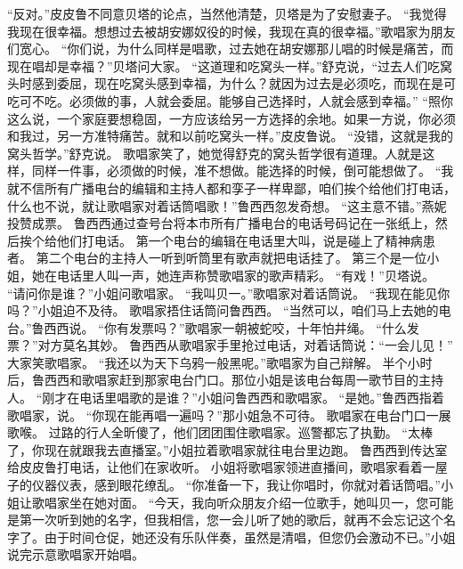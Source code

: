 \documentclass[a4paper,12pt,UTF8,twoside]{ctexbook}
\begin{document}
        “反对。”皮皮鲁不同意贝塔的论点，当然他清楚，贝塔是为了安慰妻子。  
        “我觉得我现在很幸福。想想过去被胡安娜奴役的时候，我现在真的很幸福。”歌唱家为朋友们宽心。  
        “你们说，为什么同样是唱歌，过去她在胡安娜那儿唱的时候是痛苦，而现在唱却是幸福？”贝塔问大家。  
        “这道理和吃窝头一样。”舒克说，“过去人们吃窝头时感到委屈，现在吃窝头感到幸福，为什么？就因为过去是必须吃，而现在是可吃可不吃。必须做的事，人就会委屈。能够自己选择时，人就会感到幸福。”  
        “照你这么说，一个家庭要想稳固，一方应该给另一方选择的余地。如果一方说，你必须和我过，另一方准特痛苦。就和以前吃窝头一样。”皮皮鲁说。        
        “没错，这就是我的窝头哲学。”舒克说。  
        歌唱家笑了，她觉得舒克的窝头哲学很有道理。人就是这样，同样一件事，必须做的时候，准不想做。能选择的时候，倒可能想做了。  
        “我就不信所有广播电台的编辑和主持人都和孪子一样卑鄙，咱们挨个给他们打电话，什么也不说，就让歌唱家对着话筒唱歌！”鲁西西忽发奇想。  
        “这主意不错。”燕妮投赞成票。  
        鲁西西通过查号台将本市所有广播电台的电话号码记在一张纸上，然后挨个给他们打电话。  
        第一个电台的编辑在电话里大叫，说是碰上了精神病患者。  
        第二个电台的主持人一听到听筒里有歌声就把电话挂了。  
        第三个是一位小姐，她在电话里人叫一声，她连声称赞歌唱家的歌声精彩。  
        “有戏！”贝塔说。  
        “请问你是谁？”小姐问歌唱家。  
        “我叫贝一。”歌唱家对着话筒说。  
        “我现在能见你吗？”小姐迫不及待。  
        歌唱家捂住话筒问鲁西西。  
        “当然可以，咱们马上去她的电台。”鲁西西说。  
        “你有发票吗？”歌唱家一朝被蛇咬，十年怕井绳。        
        “什么发票？”对方莫名其妙。  
        鲁西西从歌唱家手里抢过电话，对着话筒说：“一会儿见！”  
        大家笑歌唱家。  
        “我还以为天下乌鸦一般黑呢。”歌唱家为自己辩解。  
        半个小时后，鲁西西和歌唱家赶到那家电台门口。那位小姐是该电台每周一歌节目的主持人。  
        “刚才在电话里唱歌的是谁？”小姐问鲁西西和歌唱家。  
        “是她。”鲁西西指着歌唱家，说。  
        “你现在能再唱一遍吗？”那小姐急不可待。  
        歌唱家在电台门口一展歌喉。  
        过路的行人全昕傻了，他们团团围住歌唱家。巡警都忘了执勤。  
        “太棒了，你现在就跟我去直播室。”小姐拉着歌唱家就往电台里边跑。  
        鲁西西到传达室给皮皮鲁打电话，让他们在家收听。  
        小姐将歌唱家领进直播间，歌唱家看着一屋子的仪器仪表，感到眼花缭乱。  
        “你准备一下，我让你唱时，你就对着话筒唱。”小姐让歌唱家坐在她对面。  
        “今天，我向听众朋友介绍一位歌手，她叫贝一，您可能是第一次听到她的名字，但我相信，您一会儿听了她的歌后，就再不会忘记这个名字了。由于时间仓促，她还没有乐队伴奏，虽然是清唱，但您仍会激动不已。”小姐说完示意歌唱家开始唱。  
\end{document}
